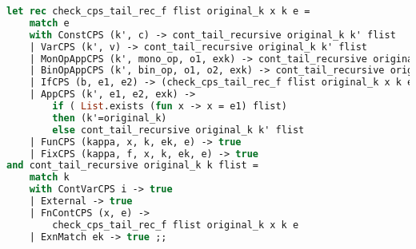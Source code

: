 \begin{lstlisting}[language=Caml, caption=Tail recursion for CPS transformed expressions]
let rec check_cps_tail_rec_f flist original_k x k e = 
    match e
    with ConstCPS (k', c) -> cont_tail_recursive original_k k' flist
    | VarCPS (k', v) -> cont_tail_recursive original_k k' flist
    | MonOpAppCPS (k', mono_op, o1, exk) -> cont_tail_recursive original_k k' flist
    | BinOpAppCPS (k', bin_op, o1, o2, exk) -> cont_tail_recursive original_k k' flist
    | IfCPS (b, e1, e2) -> (check_cps_tail_rec_f flist original_k x k e1) && (check_cps_tail_rec_f flist original_k x k e2)
    | AppCPS (k', e1, e2, exk) -> 
        if ( List.exists (fun x -> x = e1) flist)
        then (k'=original_k)
        else cont_tail_recursive original_k k' flist
    | FunCPS (kappa, x, k, ek, e) -> true
    | FixCPS (kappa, f, x, k, ek, e) -> true
and cont_tail_recursive original_k k flist = 
    match k
    with ContVarCPS i -> true
    | External -> true
    | FnContCPS (x, e) -> 
        check_cps_tail_rec_f flist original_k x k e
    | ExnMatch ek -> true ;;
\end{lstlisting}